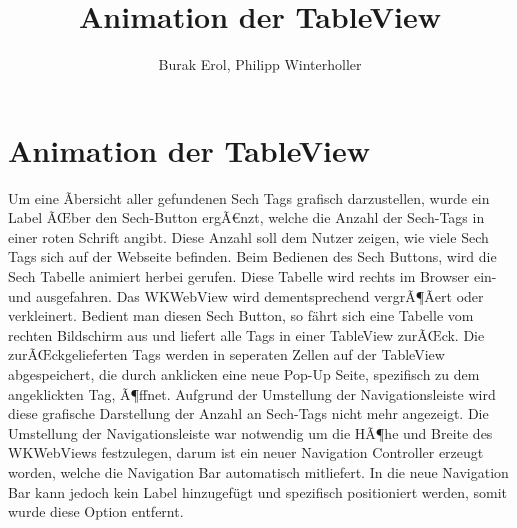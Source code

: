 
\title{Animation der TableView}
\author{Burak Erol, Philipp Winterholler}

\section{Animation der TableView}

Um eine Ãbersicht aller gefundenen Sech Tags grafisch darzustellen, wurde ein Label ÃŒber den Sech-Button ergÃ€nzt, welche die Anzahl der Sech-Tags in einer roten Schrift angibt. Diese Anzahl soll dem Nutzer zeigen, wie viele Sech Tags sich auf der Webseite befinden. Beim Bedienen des Sech Buttons, wird die Sech Tabelle animiert herbei gerufen. Diese Tabelle wird rechts im Browser ein- und ausgefahren. Das WKWebView wird dementsprechend vergrÃ¶Ãert oder verkleinert. Bedient man diesen Sech Button, so fährt sich eine Tabelle vom rechten Bildschirm aus und liefert alle Tags in einer TableView zurÃŒck. Die zurÃŒckgelieferten Tags werden in seperaten Zellen auf der TableView abgespeichert, die durch anklicken eine neue Pop-Up Seite, spezifisch zu dem angeklickten Tag, Ã¶ffnet. Aufgrund der Umstellung der Navigationsleiste wird diese grafische Darstellung der Anzahl an Sech-Tags nicht mehr angezeigt. Die Umstellung der Navigationsleiste war notwendig um die HÃ¶he und Breite des WKWebViews festzulegen, darum ist ein neuer Navigation Controller erzeugt worden, welche die Navigation Bar automatisch mitliefert. In die neue Navigation Bar kann jedoch kein Label hinzugefügt und spezifisch positioniert werden, somit wurde diese Option entfernt.

